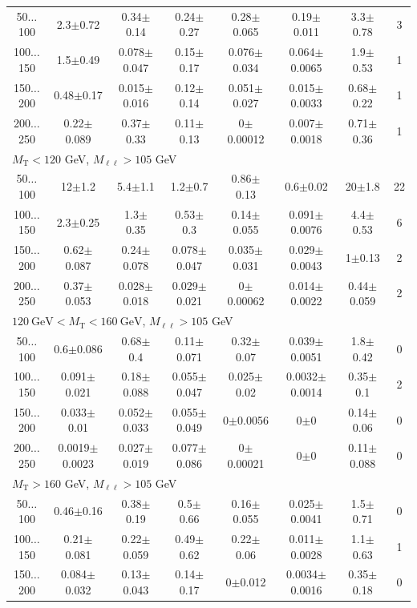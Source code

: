 \begin{landscape}
\begin{table}
\begin{center}
\begin{tabular}{| c | c c c c c c c | }
50$\dots$100&2.3$\pm$0.72&0.34$\pm$0.14&0.24$\pm$0.27&0.28$\pm$0.065&0.19$\pm$0.011&3.3$\pm$0.78&3\\
100$\dots$150&1.5$\pm$0.49&0.078$\pm$0.047&0.15$\pm$0.17&0.076$\pm$0.034&0.064$\pm$0.0065&1.9$\pm$0.53&1\\
150$\dots$200&0.48$\pm$0.17&0.015$\pm$0.016&0.12$\pm$0.14&0.051$\pm$0.027&0.015$\pm$0.0033&0.68$\pm$0.22&1\\
200$\dots$250&0.22$\pm$0.089&0.37$\pm$0.33&0.11$\pm$0.13&0$\pm$0.00012&0.007$\pm$0.0018&0.71$\pm$0.36&1\\
\hline\hline
\multicolumn{8}{l}{$M_{\text{T}} < 120$ GeV, $M_{\ell\ell} > 105$ GeV}\\\hline\hline
50$\dots$100&12$\pm$1.2&5.4$\pm$1.1&1.2$\pm$0.7&0.86$\pm$0.13&0.6$\pm$0.02&20$\pm$1.8&22\\
100$\dots$150&2.3$\pm$0.25&1.3$\pm$0.35&0.53$\pm$0.3&0.14$\pm$0.055&0.091$\pm$0.0076&4.4$\pm$0.53&6\\
150$\dots$200&0.62$\pm$0.087&0.24$\pm$0.078&0.078$\pm$0.047&0.035$\pm$0.031&0.029$\pm$0.0043&1$\pm$0.13&2\\
200$\dots$250&0.37$\pm$0.053&0.028$\pm$0.018&0.029$\pm$0.021&0$\pm$0.00062&0.014$\pm$0.0022&0.44$\pm$0.059&2\\
\hline\hline
\multicolumn{8}{l}{$120~\mathrm{GeV} < M_{\text{T}} < 160~\mathrm{GeV}$, $M_{\ell\ell} > 105$ GeV}\\\hline\hline
50$\dots$100&0.6$\pm$0.086&0.68$\pm$0.4&0.11$\pm$0.071&0.32$\pm$0.07&0.039$\pm$0.0051&1.8$\pm$0.42&0\\
100$\dots$150&0.091$\pm$0.021&0.18$\pm$0.088&0.055$\pm$0.047&0.025$\pm$0.02&0.0032$\pm$0.0014&0.35$\pm$0.1&2\\
150$\dots$200&0.033$\pm$0.01&0.052$\pm$0.033&0.055$\pm$0.049&0$\pm$0.0056&0$\pm$0&0.14$\pm$0.06&0\\
200$\dots$250&0.0019$\pm$0.0023&0.027$\pm$0.019&0.077$\pm$0.086&0$\pm$0.00021&0$\pm$0&0.11$\pm$0.088&0\\
\hline\hline
\multicolumn{8}{l}{$M_{\text{T}} > 160$ GeV, $M_{\ell\ell} > 105$ GeV}\\\hline\hline
50$\dots$100&0.46$\pm$0.16&0.38$\pm$0.19&0.5$\pm$0.66&0.16$\pm$0.055&0.025$\pm$0.0041&1.5$\pm$0.71&0\\
100$\dots$150&0.21$\pm$0.081&0.22$\pm$0.059&0.49$\pm$0.62&0.22$\pm$0.06&0.011$\pm$0.0028&1.1$\pm$0.63&1\\
150$\dots$200&0.084$\pm$0.032&0.13$\pm$0.043&0.14$\pm$0.17&0$\pm$0.012&0.0034$\pm$0.0016&0.35$\pm$0.18&0\\

\end{tabular}
\end{center}
\end{table}
\end{landscape}
